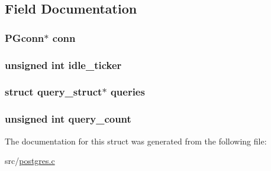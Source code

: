 \subsection{Field Documentation}
\hypertarget{structconnection__struct_af4516154f33e07be1eadff88fab71465}{
\subsubsection[{conn}]{\setlength{\rightskip}{0pt plus 5cm}P\-Gconn$\ast$ conn}}\label{structconnection__struct_af4516154f33e07be1eadff88fab71465}
\hypertarget{structconnection__struct_a2e4c5444712d727aaeb1050a4c734d4f}{
\subsubsection[{idle\-\_\-ticker}]{\setlength{\rightskip}{0pt plus 5cm}unsigned int idle\-\_\-ticker}}\label{structconnection__struct_a2e4c5444712d727aaeb1050a4c734d4f}
\hypertarget{structconnection__struct_ae8bf023f24dae989954803b34f8346f6}{
\subsubsection[{queries}]{\setlength{\rightskip}{0pt plus 5cm}struct {\bf query\-\_\-struct}$\ast$ queries}}\label{structconnection__struct_ae8bf023f24dae989954803b34f8346f6}
\hypertarget{structconnection__struct_a9d003902114bc45d2d33eb953579673a}{
\subsubsection[{query\-\_\-count}]{\setlength{\rightskip}{0pt plus 5cm}unsigned int query\-\_\-count}}\label{structconnection__struct_a9d003902114bc45d2d33eb953579673a}


The documentation for this struct was generated from the following file\-:\begin{DoxyCompactItemize}
\item 
src/\hyperlink{postgres_8c}{postgres.\-c}\end{DoxyCompactItemize}
